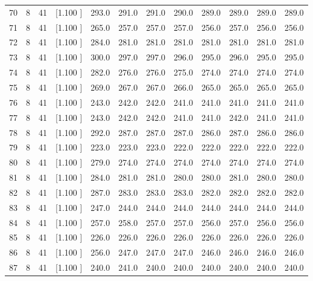 \documentclass[12pt,a4paper]{article}
\begin{document}
\begin{center}
{\begin{tabular}{r r r r r r r r r r r r}
  70&  8& 41&[1.100     ]&   293.0&   291.0&   291.0&   290.0&   289.0&   289.0&   289.0&   289.0\\[-0.02in]
  71&  8& 41&[1.100     ]&   265.0&   257.0&   257.0&   257.0&   256.0&   257.0&   256.0&   256.0\\[-0.02in]
  72&  8& 41&[1.100     ]&   284.0&   281.0&   281.0&   281.0&   281.0&   281.0&   281.0&   281.0\\[-0.02in]
  73&  8& 41&[1.100     ]&   300.0&   297.0&   297.0&   296.0&   295.0&   296.0&   295.0&   295.0\\[-0.02in]
  74&  8& 41&[1.100     ]&   282.0&   276.0&   276.0&   275.0&   274.0&   274.0&   274.0&   274.0\\[-0.02in]
  75&  8& 41&[1.100     ]&   269.0&   267.0&   267.0&   266.0&   265.0&   265.0&   265.0&   265.0\\[-0.02in]
  76&  8& 41&[1.100     ]&   243.0&   242.0&   242.0&   241.0&   241.0&   241.0&   241.0&   241.0\\[-0.02in]
  77&  8& 41&[1.100     ]&   243.0&   242.0&   242.0&   241.0&   241.0&   242.0&   241.0&   241.0\\[-0.02in]
  78&  8& 41&[1.100     ]&   292.0&   287.0&   287.0&   287.0&   286.0&   287.0&   286.0&   286.0\\[-0.02in]
  79&  8& 41&[1.100     ]&   223.0&   223.0&   223.0&   222.0&   222.0&   222.0&   222.0&   222.0\\[-0.02in]
  80&  8& 41&[1.100     ]&   279.0&   274.0&   274.0&   274.0&   274.0&   274.0&   274.0&   274.0\\[-0.02in]
  81&  8& 41&[1.100     ]&   284.0&   281.0&   281.0&   280.0&   280.0&   281.0&   280.0&   280.0\\[-0.02in]
  82&  8& 41&[1.100     ]&   287.0&   283.0&   283.0&   283.0&   282.0&   282.0&   282.0&   282.0\\[-0.02in]
  83&  8& 41&[1.100     ]&   247.0&   244.0&   244.0&   244.0&   244.0&   244.0&   244.0&   244.0\\[-0.02in]
  84&  8& 41&[1.100     ]&   257.0&   258.0&   257.0&   257.0&   256.0&   257.0&   256.0&   256.0\\[-0.02in]
  85&  8& 41&[1.100     ]&   226.0&   226.0&   226.0&   226.0&   226.0&   226.0&   226.0&   226.0\\[-0.02in]
  86&  8& 41&[1.100     ]&   256.0&   247.0&   247.0&   247.0&   246.0&   246.0&   246.0&   246.0\\[-0.02in]
  87&  8& 41&[1.100     ]&   240.0&   241.0&   240.0&   240.0&   240.0&   240.0&   240.0&   240.0\\[-0.02in]

\end{tabular}}
\end{center}
\end{document}
